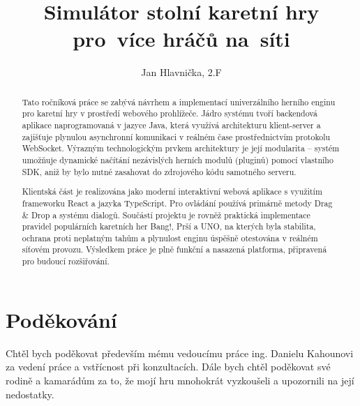 \documentclass{article}
\title{Simulátor stolní karetní hry pro~více hráčů na~síti}
\author{Jan Hlavnička, 2.F}
\begin{document}

\newpage


\newpage
\begin{abstract}
Tato ročníková práce se zabývá návrhem a implementací univerzálního herního enginu pro karetní hry v prostředí webového prohlížeče. Jádro systému tvoří backendová aplikace naprogramovaná v jazyce Java, která využívá architekturu klient-server a zajišťuje plynulou asynchronní komunikaci v reálném čase prostřednictvím protokolu WebSocket. Výrazným technologickým prvkem architektury je její modularita -- systém umožňuje dynamické načítání nezávislých herních modulů (pluginů) pomocí vlastního SDK, aniž by bylo nutné zasahovat do zdrojového kódu samotného serveru.

Klientská část je realizována jako moderní interaktivní webová aplikace s využitím frameworku React a jazyka TypeScript. Pro ovládání používá primárně metody Drag \& Drop a systému dialogů. Součástí projektu je rovněž praktická implementace pravidel populárních karetních her Bang!, Prší a UNO, na kterých byla stabilita, ochrana proti neplatným tahům a plynulost enginu úspěšně otestována v reálném síťovém provozu. Výsledkem práce je plně funkční a nasazená platforma, připravená pro budoucí rozšiřování.
\end{abstract}


\vspace{\fill}


\section*{Poděkování}
Chtěl bych poděkovat především mému vedoucímu práce ing. Danielu Kahounovi za vedení práce a vstřícnost při konzultacích. Dále bych chtěl poděkovat své rodině a kamarádům za to, že mojí hru mnohokrát vyzkoušeli a upozornili na její nedostatky. 
\newpage

\newpage


{
  \hypersetup{hidelinks}
  \setlength{\parskip}{0pt} %
  \tableofcontents
}

\newpage


\end{document}

